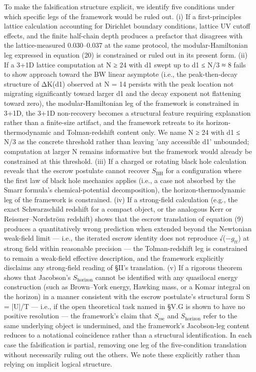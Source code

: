 \documentclass[11pt]{article}
\begin{document}
To make the falsification structure explicit, we identify five
conditions under which specific legs of the framework would be ruled
out. (i) If a first-principles lattice calculation accounting for
Dirichlet boundary conditions, lattice UV cutoff effects, and the finite
half-chain depth produces a prefactor that disagrees with the
lattice-measured 0.030--0.037 at the same protocol, the
modular-Hamiltonian leg expressed in equation (20) is constrained or
ruled out in its present form. (ii) If a 3+1D lattice computation at N ≥
24 with d1 swept up to d1 ≤ N/3 ≈ 8 fails to show approach toward the BW
linear asymptote (i.e., the peak-then-decay structure of ΔK(d1) observed
at N = 14 persists with the peak location not migrating significantly
toward larger d1 and the decay exponent not flattening toward zero), the
modular-Hamiltonian leg of the framework is constrained in 3+1D, the
3+1D non-recovery becomes a structural feature requiring explanation
rather than a finite-size artifact, and the framework retreats to its
horizon-thermodynamic and Tolman-redshift content only. We name N ≥ 24
with d1 ≤ N/3 as the concrete threshold rather than leaving 'any
accessible d1' unbounded; computation at larger N remains informative
but the framework would already be constrained at this threshold. (iii)
If a charged or rotating black hole calculation reveals that the escrow
postulate cannot recover $S_{\mathrm{BH}}$ for a configuration where the first law of
black hole mechanics applies (i.e., a case not absorbed by the Smarr
formula's chemical-potential decomposition), the horizon-thermodynamic
leg of the framework is constrained. (iv) If a strong-field calculation
(e.g., the exact Schwarzschild redshift for a compact object, or the
analogous Kerr or Reissner--Nordström redshift) shows that the escrow
translation of equation (9) produces a quantitatively wrong prediction
when extended beyond the Newtonian weak-field limit --- i.e., the
iterated escrow identity does not reproduce √(−$g_{tt}$) at strong field
within reasonable precision --- the Tolman-redshift leg is constrained
to remain a weak-field effective description, and the framework
explicitly disclaims any strong-field reading of §II's translation. (v)
If a rigorous theorem shows that Jacobson's $S_{\mathrm{horizon}}$ cannot be
identified with any quasilocal energy construction (such as Brown--York
energy, Hawking mass, or a Komar integral on the horizon) in a manner
consistent with the escrow postulate's structural form S = |U|/T ---
i.e., if the open theoretical task named in §V.G is shown to have no
positive resolution --- the framework's claim that $S_{\mathrm{esc}}$ and $S_{\mathrm{horizon}}$
refer to the same underlying object is undermined, and the framework's
Jacobson-leg content reduces to a notational coincidence rather than a
structural identification. In each case the falsification is partial,
removing one leg of the five-condition translation without necessarily
ruling out the others. We note these explicitly rather than relying on
implicit logical structure.
\end{document}
